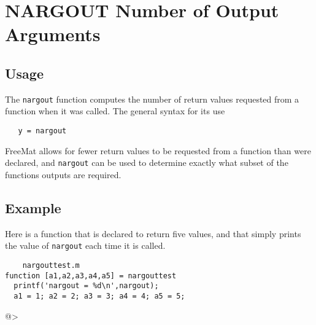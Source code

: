 \section{NARGOUT Number of Output Arguments}

\subsection{Usage}

The \verb|nargout| function computes the number of return values requested from
a function when it was called.  The general syntax for its use
\begin{verbatim}
   y = nargout
\end{verbatim}
FreeMat allows for
fewer return values to be requested from a function than were declared,
and \verb|nargout| can be used to determine exactly what subset of 
the functions outputs are required.  
\subsection{Example}

Here is a function that is declared to return five 
values, and that simply prints the value of \verb|nargout|
each time it is called.
\begin{verbatim}
    nargouttest.m
function [a1,a2,a3,a4,a5] = nargouttest
  printf('nargout = %d\n',nargout);
  a1 = 1; a2 = 2; a3 = 3; a4 = 4; a5 = 5;
\end{verbatim}
@>
